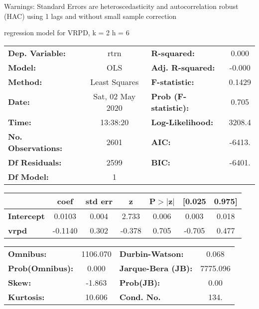 Warnings: \newline
 [1] Standard Errors are heteroscedasticity and autocorrelation robust (HAC) using 1 lags and without small sample correction\ 

regression model for VRPD, k = 2 h = 6\begin{center}
\begin{tabular}{lclc}
\toprule
\textbf{Dep. Variable:}    &       rtrn       & \textbf{  R-squared:         } &     0.000   \\
\textbf{Model:}            &       OLS        & \textbf{  Adj. R-squared:    } &    -0.000   \\
\textbf{Method:}           &  Least Squares   & \textbf{  F-statistic:       } &    0.1429   \\
\textbf{Date:}             & Sat, 02 May 2020 & \textbf{  Prob (F-statistic):} &    0.705    \\
\textbf{Time:}             &     13:38:20     & \textbf{  Log-Likelihood:    } &    3208.4   \\
\textbf{No. Observations:} &        2601      & \textbf{  AIC:               } &    -6413.   \\
\textbf{Df Residuals:}     &        2599      & \textbf{  BIC:               } &    -6401.   \\
\textbf{Df Model:}         &           1      & \textbf{                     } &             \\
\bottomrule
\end{tabular}
\begin{tabular}{lcccccc}
                   & \textbf{coef} & \textbf{std err} & \textbf{z} & \textbf{P$> |$z$|$} & \textbf{[0.025} & \textbf{0.975]}  \\
\midrule
\textbf{Intercept} &       0.0103  &        0.004     &     2.733  &         0.006        &        0.003    &        0.018     \\
\textbf{vrpd}      &      -0.1140  &        0.302     &    -0.378  &         0.705        &       -0.705    &        0.477     \\
\bottomrule
\end{tabular}
\begin{tabular}{lclc}
\textbf{Omnibus:}       & 1106.070 & \textbf{  Durbin-Watson:     } &    0.068  \\
\textbf{Prob(Omnibus):} &   0.000  & \textbf{  Jarque-Bera (JB):  } & 7775.096  \\
\textbf{Skew:}          &  -1.863  & \textbf{  Prob(JB):          } &     0.00  \\
\textbf{Kurtosis:}      &  10.606  & \textbf{  Cond. No.          } &     134.  \\
\bottomrule
\end{tabular}
\end{center}

